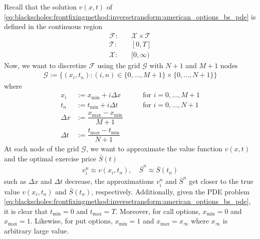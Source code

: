 Recall that the solution $v(x,t)$ of 
\eqref{eq:blackscholes:frontfixingmethod:inversetransform:american_options_bs_pde} is defined in the continuous region 
\begin{align*}
  \mathcal{F}: \quad & \mathcal{X} \times \mathcal{T} \\
  \mathcal{T}: \quad & [0, T] \\
  \mathcal{X}: \quad & [0, \infty)
\end{align*}
Now, we want to discretize $\mathcal{F}$ using the grid $\mathcal{G}$ with $N+1$ and $M+1$ nodes
\begin{align*}
  \mathcal{G} := \{(x_i, t_n): (i, n) \in \{0,\dots,M+1\}\times\{0,\dots,N+1\}\}
\end{align*}
where
\begin{align*}
  x_i &:= x_{\text{min}} + i\Delta x &  \qquad \text{for $i = 0,\dots, M+1$} \\
  t_n &:= t_{\text{min}} + i{\Delta t} & \qquad \text{for $i = 0,\dots, N+1$} \\
  \Delta{x} &:= \dfrac{x_{\text{max}} - x_{\text{min}}}{M+1} \\ 
  \Delta{t} &:= \dfrac{t_{\text{max}} - t_{\text{min}}}{N+1}
\end{align*}
At each node of the grid $\mathcal{G}$, we want to approximate the value function $v(x, t)$ and the optimal exercise price $\bar{S}(t)$ 
\begin{align*}
  v^{n}_i \approx v(x_i,t_n), \quad \bar{S}^{n} \approx \bar{S}(t_n)
\end{align*}
such as $\Delta{x}$ and $\Delta{t}$ decrease, the approximations $v^{n}_i$ and $\bar{S}^n$ get closer to the true value $v(x_i, t_n)$ and $\bar{S}(t_n)$, respectively. Additionally, given the PDE problem \eqref{eq:blackscholes:frontfixingmethod:inversetransform:american_options_bs_pde}, it is clear that $t_\text{min} = 0$ and $t_\text{max}=T$. Moreover, for call options, $x_\text{min} = 0$ and $x_\text{max}=1$. Likewise, for put options, $x_\text{min}=1$ and $x_\text{max}=x_\infty$ where $x_\infty$ is arbitrary large value.
